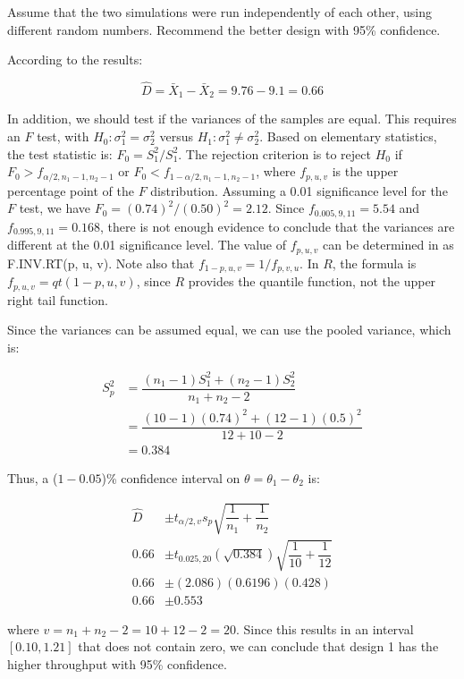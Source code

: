 \documentclass[
]{book}
\theoremstyle{definition}
\theoremstyle{definition}
\theoremstyle{definition}
\theoremstyle{definition}
\theoremstyle{remark}
\begin{document}
Assume that the two simulations were run independently of each other,
using different random numbers. Recommend the better design with 95\%
confidence.

According to the results:

\[\hat{D} = \bar{X}_1 - \bar{X}_2 = 9.76 - 9.1 = 0.66\]

In addition, we should test if the variances of the samples are equal.
This requires an \(F\) test, with \(H_0: \sigma_{1}^{2} = \sigma_{2}^{2}\)
versus \(H_1: \sigma_{1}^{2} \neq \sigma_{2}^{2}\). Based on elementary
statistics, the test statistic is: \(F_0 = S_{1}^{2}/S_{1}^{2}\). The
rejection criterion is to reject \(H_0\) if
\(F_0 > f_{\alpha/2, n_1-1, n_2 -1}\) or
\(F_0 < f_{1-\alpha/2, n_1-1, n_2 -1}\), where \(f_{p, u, v}\) is the upper
percentage point of the \(F\) distribution. Assuming a 0.01 significance
level for the \(F\) test, we have \(F_0 = (0.74)^{2}/(0.50)^{2} = 2.12\).
Since \(f_{0.005, 9, 11} = 5.54\) and \(f_{0.995, 9, 11} = 0.168\), there is
not enough evidence to conclude that the variances are different at the
0.01 significance level. The value of \(f_{p, u, v}\) can be determined in
as F.INV.RT(p, u, v). Note also that \(f_{1-p, u, v} = 1/f_{p, v, u}\). In
\(R\), the formula is \(f_{p, u, v} = qt(1-p, u,v)\), since \(R\) provides the
quantile function, not the upper right tail function.

Since the variances can be assumed equal, we can use the pooled
variance, which is:

\[\begin{aligned}
S_p^2 & = \dfrac{(n_1 - 1)S_1^2 + (n_2 - 1)S_2^2}{n_1 + n_2 - 2}\\
  & = \dfrac{(10 - 1)(0.74)^2 + (12 - 1)(0.5)^2}{12 + 10 - 2} \\
  & = 0.384\end{aligned}\]

Thus, a (\(1 -0.05\))\% confidence interval on
\(\theta = \theta_1 - \theta_2\) is:

\[\begin{aligned}
\hat{D} & \pm t_{\alpha/2 , v} s_p \sqrt{\dfrac{1}{n_1} + \dfrac{1}{n_2}} \\
0.66 &  \pm t_{0.025 , 20} (\sqrt{0.384}) \sqrt{\dfrac{1}{10} + \dfrac{1}{12}} \\
0.66 & \pm (2.086)(0.6196)(0.428) \\
0.66 & \pm 0.553\end{aligned}\]

where \(v = n_1 + n_2 - 2 = 10 + 12 - 2 = 20\). Since this results in an
interval \([0.10, 1.21]\) that does not contain zero, we can conclude that
design 1 has the higher throughput with 95\% confidence.
\end{document}
